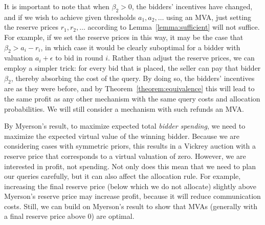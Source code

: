It is important to note that when $\beta_2 > 0$, the bidders' incentives
have changed, and if we wish to achieve given  thresholds $a_1, a_2,
\ldots$ using an MVA, just setting the reserve prices $r_1, r_2, \ldots$
according to Lemma~\ref{lemma:sufficient} will not suffice.  For example,
if we set the reserve prices in this way,
it may be the case that $\beta_2 > a_i - r_i$, in which case it would be
clearly suboptimal for a bidder with valuation $a_i+\epsilon$ to bid in
round $i$.
Rather than
adjust the reserve prices, we can employ a simpler trick: for every bid
that is placed, the seller can pay that bidder $\beta_2$, thereby absorbing
the cost of the query.  By doing so, the bidders' incentives are as they
were before, 
and by
Theorem~\ref{theorem:equivalence} this will lead to the same profit as any
other mechanism with the same query costs and allocation probabilities.
We will still consider a mechanism with such refunds an MVA.



By Myerson's result, to maximize expected total {\em bidder spending}, we need to
maximize the expected virtual value of the winning bidder.  
Because we are considering cases with symmetric priors, this results in a
Vickrey auction with a reserve price that corresponds to a virtual
valuation of zero.
However, we are
interested in profit, not spending.  Not only does this mean that we need
to plan our queries carefully, but it can also affect the allocation rule.
For example, increasing the final reserve price (below which we do not
allocate) slightly above Myerson's reserve price may increase profit,
because it will reduce communication costs.  Still, we can build on
Myerson's result to show that MVAs (generally with a final reserve price
above $0$) are optimal.



